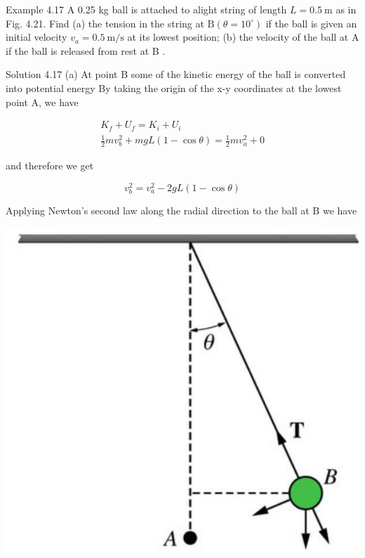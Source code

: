 \documentclass[10pt]{article}
\begin{document}
Example 4.17 A 0.25 kg ball is attached to alight string of length $L=0.5 \mathrm{~m}$ as in Fig. 4.21. Find (a) the tension in the string at $\mathrm{B}\left(\theta=10^{\circ}\right)$ if the ball is given an initial velocity $v_{a}=0.5 \mathrm{~m} / \mathrm{s}$ at its lowest position; (b) the velocity of the ball at A if the ball is released from rest at B .

Solution 4.17 (a) At point B some of the kinetic energy of the ball is converted into potential energy By taking the origin of the x-y coordinates at the lowest point A, we have

$$
\begin{gathered}
K_{f}+U_{f}=K_{i}+U_{i} \\
\frac{1}{2} m v_{b}^{2}+m g L(1-\cos \theta)=\frac{1}{2} m v_{a}^{2}+0
\end{gathered}
$$

and therefore we get


\begin{equation*}
v_{b}^{2}=v_{a}^{2}-2 g L(1-\cos \theta) \tag{4.4}
\end{equation*}


Applying Newton's second law along the radial direction to the ball at B we have

\begin{center}
\includegraphics[max width=\textwidth]{2024_09_13_db1f357d2aad0a03eb2eg-074(1)}
\end{center}
\end{document}
